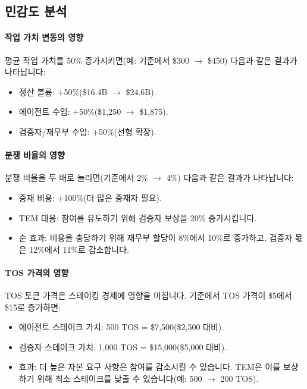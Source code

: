 \documentclass[11pt]{article}
\begin{document}
\subsection{민감도 분석}
\paragraph{작업 가치 변동의 영향}
평균 작업 가치를 50\% 증가시키면(예: 기준에서 \$300 $\to$ \$450) 다음과 같은 결과가 나타납니다:
\begin{itemize}[noitemsep]
  \item 정산 볼륨: +50\%(\$16.4B $\to$ \$24.6B).
  \item 에이전트 수입: +50\%(\$1{,}250 $\to$ \$1{,}875).
  \item 검증자/재무부 수입: +50\%(선형 확장).
\end{itemize}

\paragraph{분쟁 비율의 영향}
분쟁 비율을 두 배로 늘리면(기준에서 2\% $\to$ 4\%) 다음과 같은 결과가 나타납니다:
\begin{itemize}[noitemsep]
  \item 중재 비용: +100\%(더 많은 중재자 필요).
  \item TEM 대응: 참여를 유도하기 위해 검증자 보상을 20\% 증가시킵니다.
  \item 순 효과: 비용을 충당하기 위해 재무부 할당이 8\%에서 10\%로 증가하고, 검증자 몫은 12\%에서 11\%로 감소합니다.
\end{itemize}

\paragraph{TOS 가격의 영향}
TOS 토큰 가격은 스테이킹 경제에 영향을 미칩니다. 기준에서 TOS 가격이 \$5에서 \$15로 증가하면:
\begin{itemize}[noitemsep]
  \item 에이전트 스테이크 가치: 500 TOS = \$7{,}500(\$2{,}500 대비).
  \item 검증자 스테이크 가치: 1,000 TOS = \$15{,}000(\$5{,}000 대비).
  \item 효과: 더 높은 자본 요구 사항은 참여를 감소시킬 수 있습니다. TEM은 이를 보상하기 위해 최소 스테이크를 낮출 수 있습니다(예: 500 $\to$ 200 TOS).
\end{itemize}
\end{document}
